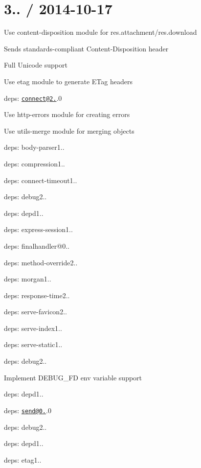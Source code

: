 \section*{3.. / 2014-\/10-\/17 }


\begin{DoxyItemize}
\item Use {\ttfamily content-\/disposition} module for {\ttfamily res.\+attachment}/{\ttfamily res.\+download}
\begin{DoxyItemize}
\item Sends standards-\/compliant {\ttfamily Content-\/\+Disposition} header
\item Full Unicode support
\end{DoxyItemize}
\item Use {\ttfamily etag} module to generate {\ttfamily E\+Tag} headers
\item deps\+: \href{mailto:connect@2.27}{\tt connect@2.}.0
\begin{DoxyItemize}
\item Use {\ttfamily http-\/errors} module for creating errors
\item Use {\ttfamily utils-\/merge} module for merging objects
\item deps\+: body-\/parser1..
\item deps\+: compression1..
\item deps\+: connect-\/timeout1..
\item deps\+: debug2..
\item deps\+: depd1..
\item deps\+: express-\/session1..
\item deps\+: finalhandler@0..
\item deps\+: method-\/override2..
\item deps\+: morgan1..
\item deps\+: response-\/time2..
\item deps\+: serve-\/favicon2..
\item deps\+: serve-\/index1..
\item deps\+: serve-\/static1..
\end{DoxyItemize}
\item deps\+: debug2..
\begin{DoxyItemize}
\item Implement {\ttfamily D\+E\+B\+U\+G\+\_\+\+F\+D} env variable support
\end{DoxyItemize}
\item deps\+: depd1..
\item deps\+: \href{mailto:send@0.10}{\tt send@0.}.0
\begin{DoxyItemize}
\item deps\+: debug2..
\item deps\+: depd1..
\item deps\+: etag1..
\end{DoxyItemize}
\end{DoxyItemize}

